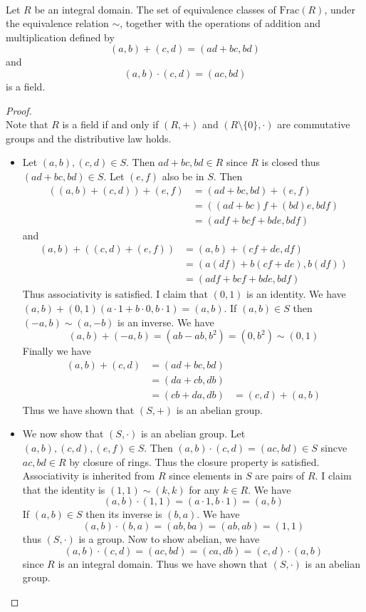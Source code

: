 \documentclass[a4paper]{article}
\begin{document}
\begin{prp}{}{}\\
Let $R$ be an integral domain. The set of equivalence classes of $\text{Frac}(R)$, under the equivalence relation $\sim$, together with the operations of addition and multiplication defined by $$(a,b)+(c,d)=(ad+bc,bd)$$ and $$(a,b)\cdot(c,d)=(ac,bd)$$ is a field. 
\begin{proof}\\
Note that $R$ is a field if and only if $(R,+)$ and $(R\setminus\{0\},\cdot)$ are commutative groups and the distributive law holds. 
\begin{itemize}
\item Let $(a,b),(c,d)\in S$. Then $ad+bc,bd\in R$ since $R$ is closed thus $(ad+bc,bd)\in S$. Let $(e,f)$ also be in $S$. Then 
\begin{align*}
((a,b)+(c,d))+(e,f)&=(ad+bc,bd)+(e,f)\\
&=((ad+bc)f+(bd)e,bdf)\\
&=(adf+bcf+bde,bdf)
\end{align*}
and 
\begin{align*}
(a,b)+((c,d)+(e,f))&=(a,b)+(cf+de,df)\\
&=(a(df)+b(cf+de),b(df))\\
&=(adf+bcf+bde,bdf)
\end{align*}
Thus associativity is satisfied. I claim that $(0,1)$ is an identity. We have $(a,b)+(0,1)(a\cdot 1+b\cdot 0,b\cdot 1)=(a,b)$. If $(a,b)\in S$ then $(-a,b)\sim(a,-b)$ is an inverse. We have $$(a,b)+(-a,b)=(ab-ab,b^2)=(0,b^2)\sim(0,1)$$ Finally we have 
\begin{align*}
(a,b)+(c,d)&=(ad+bc,bd)\\
&=(da+cb,db)\tag{$R$ is an Integral Domain}\\
&=(cb+da,db)\tag{$R$ is an abelian group}
&=(c,d)+(a,b)
\end{align*}
Thus we have shown that $(S,+)$ is an abelian group. 
\item We now show that $(S,\cdot)$ is an abelian group. Let $(a,b),(c,d),(e,f)\in S$. Then $(a,b)\cdot(c,d)=(ac,bd)\in S$ sincve $ac,bd\in R$ by closure of rings. Thus the closure property is satisfied. Associativity is inherited from $R$ since elements in $S$ are pairs of $R$. I claim that the identity is $(1,1)\sim(k,k)$ for any $k\in R$. We have $$(a,b)\cdot(1,1)=(a\cdot1,b\cdot 1)=(a,b)$$ If $(a,b)\in S$ then its inverse is $(b,a)$. We have $$(a,b)\cdot(b,a)=(ab,ba)=(ab,ab)=(1,1)$$ thus $(S,\cdot)$ is a group. Now to show abelian, we have $$(a,b)\cdot(c,d)=(ac,bd)=(ca,db)=(c,d)\cdot(a,b)$$ since $R$ is an integral domain. Thus we have shown that $(S,\cdot)$ is an abelian group. 

\end{itemize}
\end{proof}
\end{prp}
\end{document}
